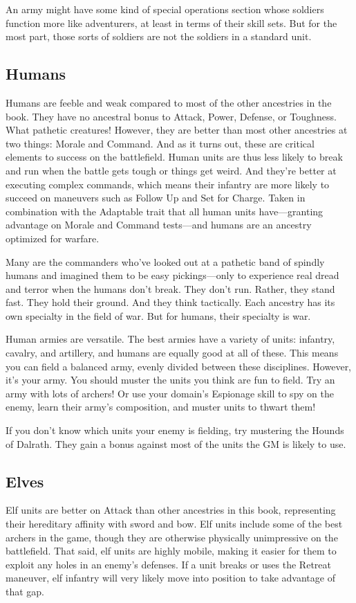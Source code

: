 \documentclass[10pt,a4paper,twoside,bg=print,twocolumn,openany,nodeprecatedcode]{dndbook}
\begin{document}
An army might have some kind of special operations section whose soldiers function more like adventurers, at least in terms of their skill sets. But for the most part, those sorts of soldiers are not the soldiers in a standard unit.

\subsection{Humans}
Humans are feeble and weak compared to most of the other ancestries in the book. They have no ancestral bonus to Attack, Power, Defense, or Toughness. What pathetic creatures! However, they are better than most other ancestries at two things: Morale and Command. And as it turns out, these are critical elements to success on the battlefield. Human units are thus less likely to break and run when the battle gets tough or things get weird. And they're better at executing complex commands, which means their infantry are more likely to succeed on maneuvers such as Follow Up and Set for Charge. Taken in combination with the Adaptable trait that all human units have—granting advantage on Morale and Command tests—and humans are an ancestry optimized for warfare.

Many are the commanders who've looked out at a pathetic band of spindly humans and imagined them to be easy pickings—only to experience real dread and terror when the humans don't break. They don't run. Rather, they stand fast. They hold their ground. And they think tactically. Each ancestry has its own specialty in the field of war. But for humans, their specialty is war.

Human armies are versatile. The best armies have a variety of units: infantry, cavalry, and artillery, and humans are equally good at all of these. This means you can field a balanced army, evenly divided between these disciplines. However, it's your army. You should muster the units you think are fun to field. Try an army with lots of archers! Or use your domain's Espionage skill to spy on the enemy, learn their army's composition, and muster units to thwart them!

If you don't know which units your enemy is fielding, try mustering the Hounds of Dalrath. They gain a bonus against most of the units the GM is likely to use.

\subsection{Elves}
Elf units are better on Attack than other ancestries in this book, representing their hereditary affinity with sword and bow. Elf units include some of the best archers in the game, though they are otherwise physically unimpressive on the battlefield. That said, elf units are highly mobile, making it easier for them to exploit any holes in an enemy's defenses. If a unit breaks or uses the Retreat maneuver, elf infantry will very likely move into position to take advantage of that gap.
\end{document}

